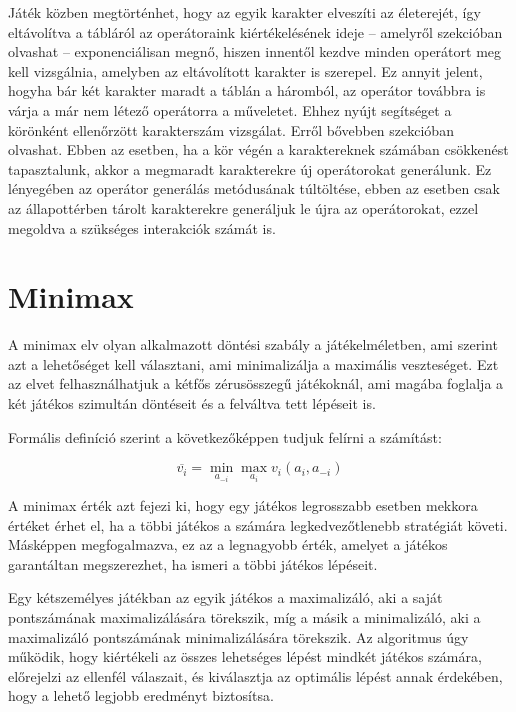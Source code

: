 \documentclass[
]{thesis-ekf}
\theoremstyle{definition}
\theoremstyle{remark}
\begin{document}
Játék közben megtörténhet, hogy az egyik karakter elveszíti az életerejét, így eltávolítva a tábláról az operátoraink kiértékelésének ideje -- amelyről  szekcióban olvashat -- exponenciálisan megnő, hiszen innentől kezdve minden operátort meg kell vizsgálnia, amelyben az eltávolított karakter is szerepel. Ez annyit jelent, hogyha bár két karakter maradt a táblán a háromból, az operátor továbbra is várja a már nem létező operátorra a műveletet. Ehhez nyújt segítséget a körönként ellenőrzött karakterszám vizsgálat. Erről bővebben  szekcióban olvashat. Ebben az esetben, ha a kör végén a karaktereknek számában csökkenést tapasztalunk, akkor a megmaradt karakterekre új operátorokat generálunk. Ez lényegében az operátor generálás metódusának túltöltése, ebben az esetben csak az állapottérben tárolt karakterekre generáljuk le újra az operátorokat, ezzel megoldva a szükséges interakciók számát is.



\section{Minimax} \label{minimax}

A minimax elv olyan alkalmazott döntési szabály a játékelméletben, ami szerint azt a lehetőséget kell választani, ami minimalizálja a maximális veszteséget. Ezt az elvet felhasználhatjuk a kétfős zérusösszegű játékoknál, ami magába foglalja a két játékos szimultán döntéseit és a felváltva tett lépéseit is. \cite{MiniMaxEnWiki}

Formális definíció szerint a következőképpen tudjuk felírni a számítást:

\begin{equation*}
	\overline{v_{i}}=\underset{{a_{-i}}}{\min} \underset{{a_{i}}}{\max} v_{i}(a_{i}, a_{-i})
\end{equation*}

A minimax érték azt fejezi ki, hogy egy játékos legrosszabb esetben mekkora értéket érhet el, ha a többi játékos a számára legkedvezőtlenebb stratégiát követi. Másképpen megfogalmazva, ez az a legnagyobb érték, amelyet a játékos garantáltan megszerezhet, ha ismeri a többi játékos lépéseit. 

Egy kétszemélyes játékban az egyik játékos a maximalizáló, aki a saját pontszámának maximalizálására törekszik, míg a másik a minimalizáló, aki a maximalizáló pontszámának minimalizálására törekszik. Az algoritmus úgy működik, hogy kiértékeli az összes lehetséges lépést mindkét játékos számára, előrejelzi az ellenfél válaszait, és kiválasztja az optimális lépést annak érdekében, hogy a lehető legjobb eredményt biztosítsa. \cite{MiniMaxGfG}
\end{document}
